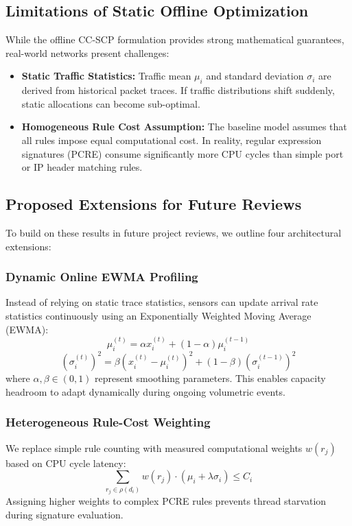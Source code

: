 \documentclass[conference]{IEEEtran}
\begin{document}
\subsection{Limitations of Static Offline Optimization}
While the offline CC-SCP formulation provides strong mathematical guarantees, real-world networks present challenges:
\begin{itemize}
    \item \textbf{Static Traffic Statistics:} Traffic mean $\mu_i$ and standard deviation $\sigma_i$ are derived from historical packet traces. If traffic distributions shift suddenly, static allocations can become sub-optimal.
    \item \textbf{Homogeneous Rule Cost Assumption:} The baseline model assumes that all rules impose equal computational cost. In reality, regular expression signatures (PCRE) consume significantly more CPU cycles than simple port or IP header matching rules.
\end{itemize}

\subsection{Proposed Extensions for Future Reviews}
To build on these results in future project reviews, we outline four architectural extensions:

\subsubsection{Dynamic Online EWMA Profiling}
Instead of relying on static trace statistics, sensors can update arrival rate statistics continuously using an Exponentially Weighted Moving Average (EWMA):
\begin{equation}
\mu_i^{(t)} = \alpha x_i^{(t)} + (1 - \alpha)\mu_i^{(t-1)}
\end{equation}
\begin{equation}
(\sigma_i^{(t)})^2 = \beta (x_i^{(t)} - \mu_i^{(t)})^2 + (1 - \beta)(\sigma_i^{(t-1)})^2
\end{equation}
where $\alpha, \beta \in (0, 1)$ represent smoothing parameters. This enables capacity headroom to adapt dynamically during ongoing volumetric events.

\subsubsection{Heterogeneous Rule-Cost Weighting}
We replace simple rule counting with measured computational weights $w(r_j)$ based on CPU cycle latency:
\begin{equation}
\sum_{r_j \in \rho(d_i)} w(r_j) \cdot (\mu_i + \lambda\sigma_i) \le C_i
\end{equation}
Assigning higher weights to complex PCRE rules prevents thread starvation during signature evaluation.
\end{document}
